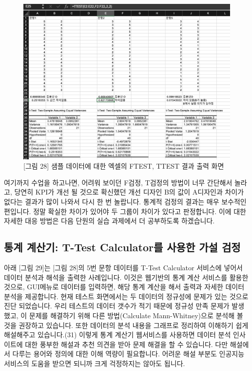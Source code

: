 \documentclass[
  letterpaper,
]{book}
\begin{document}
\begin{figure}[H]

{\centering \includegraphics{img/fig28.png}

}

\caption{{[}그림 28{]} 샘플 데이터에 대한 엑셀의 FTEST, TTEST 결과 출력
화면}

\end{figure}%

여기까지 수업을 하고나면, 어려워 보이던 F검정, T검정의 방법이 너무
간단해서 놀라고, 당연히 KPI가 개선 될 것으로 확신했던 개선 디자인 B의
값이 A디자인과 차이가 없다는 결과가 많이 나와서 다시 한 번 놀랍니다.
통계적 검정의 결과는 매우 보수적인 편입니다. 정말 확실한 차이가 있어야
두 그룹이 차이가 있다고 판정합니다. 이에 대한 자세한 대응 방법은 다음
단원의 실습 과제에서 더 공부하도록 하겠습니다.

\subsection{통계 계산기: T-Test Calculator를 사용한 가설
검정}\label{uxd1b5uxacc4-uxacc4uxc0b0uxae30-t-test-calculatoruxb97c-uxc0acuxc6a9uxd55c-uxac00uxc124-uxac80uxc815}

아래 {[}그림 29{]}는 {[}그림 28{]}의 5번 문항 데이터를 T-Test Calculator
서비스에 넣어서 데이터 분석과 해석을 출력한 사례입니다. 이것은 웹기반의
통계 계산 서비스를 활용한 것으로, GUI메뉴로 데이터를 입력하면, 해당 통계
계산을 해서 출력과 자세한 데이터 분석을 제공합니다. 현재 테스트
화면에서는 두 데이터의 정규성에 문제가 있는 것으로 진단 되었습니다. 우리
테스트의 데이터 갯수가 적기 때문에 정규성 만족 문제가 발생했고, 이
문제를 해결하기 위해 다른 방법(Calculate Mann-Whitney)으로 분석해 볼
것을 권장하고 있습니다. 또한 데이터의 분석 내용을 그래프로 정리하여
이해하기 쉽게 해설해주고 있습니다.(31) 이렇게 통계 계산기 웹서비스를
사용하면 데이터 분석 인사이트에 대한 풍부한 해설과 추천 의견을 받아 문제
해결을 할 수 있습니다. 다만 해설에서 다루는 용어와 정의에 대한 이해
역량이 필요합니다. 어려운 해설 부분도 인공지능 서비스의 도움을 받으면
되니까 크게 걱정하지는 않아도 됩니다.
\end{document}
